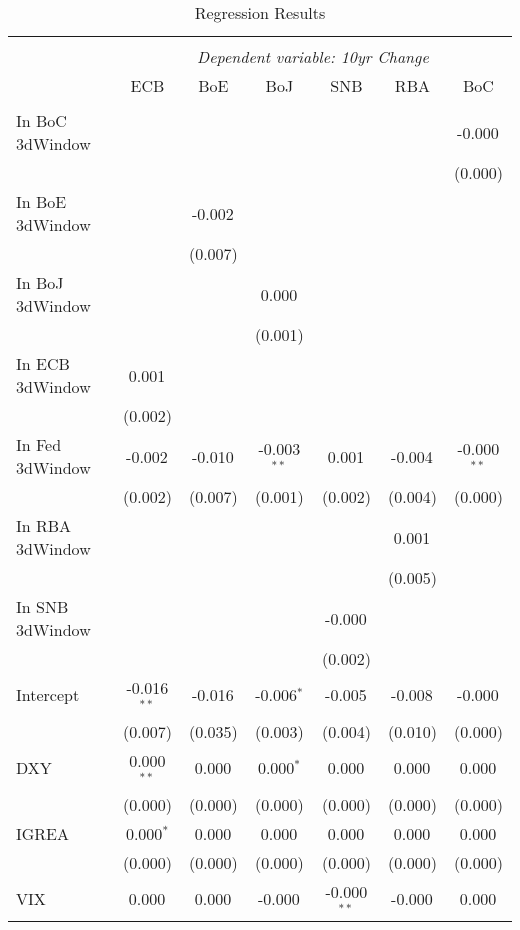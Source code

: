 \begin{table}[!htbp] \centering
  \caption{Regression Results}
\begin{tabular}{@{\extracolsep{5pt}}lcccccc}
\\[-1.8ex]\hline
\hline \\[-1.8ex]
& \multicolumn{6}{c}{\textit{Dependent variable: 10yr Change}} \
\cr \cline{2-7}
\\[-1.8ex] & \multicolumn{1}{c}{ECB} & \multicolumn{1}{c}{BoE} & \multicolumn{1}{c}{BoJ} & \multicolumn{1}{c}{SNB} & \multicolumn{1}{c}{RBA} & \multicolumn{1}{c}{BoC}  \\
\hline \\[-1.8ex]
 In BoC 3dWindow & & & & & & -0.000$^{}$ \\
& & & & & & (0.000) \\
 In BoE 3dWindow & & -0.002$^{}$ & & & & \\
& & (0.007) & & & & \\
 In BoJ 3dWindow & & & 0.000$^{}$ & & & \\
& & & (0.001) & & & \\
 In ECB 3dWindow & 0.001$^{}$ & & & & & \\
& (0.002) & & & & & \\
 In Fed 3dWindow & -0.002$^{}$ & -0.010$^{}$ & -0.003$^{**}$ & 0.001$^{}$ & -0.004$^{}$ & -0.000$^{**}$ \\
& (0.002) & (0.007) & (0.001) & (0.002) & (0.004) & (0.000) \\
 In RBA 3dWindow & & & & & 0.001$^{}$ & \\
& & & & & (0.005) & \\
 In SNB 3dWindow & & & & -0.000$^{}$ & & \\
& & & & (0.002) & & \\
 Intercept & -0.016$^{**}$ & -0.016$^{}$ & -0.006$^{*}$ & -0.005$^{}$ & -0.008$^{}$ & -0.000$^{}$ \\
& (0.007) & (0.035) & (0.003) & (0.004) & (0.010) & (0.000) \\
 DXY & 0.000$^{**}$ & 0.000$^{}$ & 0.000$^{*}$ & 0.000$^{}$ & 0.000$^{}$ & 0.000$^{}$ \\
& (0.000) & (0.000) & (0.000) & (0.000) & (0.000) & (0.000) \\
 IGREA & 0.000$^{*}$ & 0.000$^{}$ & 0.000$^{}$ & 0.000$^{}$ & 0.000$^{}$ & 0.000$^{}$ \\
& (0.000) & (0.000) & (0.000) & (0.000) & (0.000) & (0.000) \\
 VIX & 0.000$^{}$ & 0.000$^{}$ & -0.000$^{}$ & -0.000$^{**}$ & -0.000$^{}$ & 0.000$^{}$ \\

\end{tabular}
\end{table}
